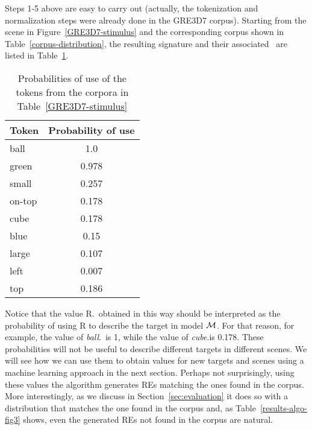 
Steps 1-5 above are easy to carry out (actually, the tokenization and normalization steps were already done in the GRE3D7 corpus). Starting from the scene in Figure~\ref{GRE3D7-stimulus} and the corresponding corpus shown in Table~\ref{corpus-distribution}, the resulting signature and their associated \puse\ are listed in Table~\ref{probability-of-use}. 

\begin{table}[h!]
\begin{center}
\begin{tabular}{|l|c|}
\hline
Token & Probability of use \\
\hline
ball & 1.0 \\
green & 0.978 \\
small & 0.257 \\
on-top & 0.178 \\ 
cube & 0.178 \\
blue & 0.15 \\
large & 0.107 \\
left & 0.007 \\
top & 0.186 \\
\hline
\end{tabular}
\caption{Probabilities of use of the tokens from the corpora in Table~\ref{GRE3D7-stimulus}\label{probability-of-use}}
\end{center}
\end{table}

Notice that the value R.\puse\ obtained in this way should be interpreted as the probability of using R to describe the target in model $\mathcal{M}$.  
For that reason, for example, the value of \emph{ball}.\puse\ is 1, while the value of \emph{cube}.\puse is 0.178.  These probabilities will not be useful to describe different targets in different scenes.  We will see how we can use them to obtain values for new targets and scenes using a machine learning approach in the next section.  Perhaps not surprisingly, using these values the algorithm generates REs matching the ones found in the corpus.  More interestingly, as we discuss in Section~\ref{sec:evaluation} it does so with a distribution that matches the one found in the corpus and, as Table~\ref{results-algo-fig3} shows, even the generated REs not found in the corpus are natural.    

